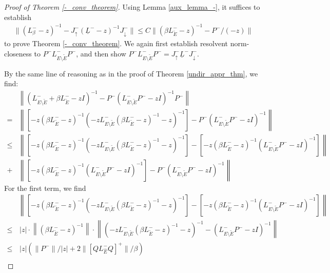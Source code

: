\documentclass[reqno,12pt,letterpaper]{amsart}
\numberwithin{equation}{section}
\newcommand{\Lin}{L^{-}}
\newcommand{\1}{\mathds{1}}
\theoremstyle{definition}
\begin{document}
\begin{proof}[Proof of Theorem \ref{-_conv_theorem}]
	Using Lemma \ref{aux_lemma_-}, it suffices to establish 
	\begin{align}
		\| (\Lin_\beta - z)^{-1} - J^-_{\uparrow} (\underline{L}^- -z)^{-1}  J^-_{\downarrow} \|
		\leq C \| (\beta \Lin_{\tilde{E}} -z)^{-1} - P^-/(-z)\| 
	\end{align}
	to prove Theorem  \ref{-_conv_theorem}.
	We again first establish resolvent norm-closeness to $P^- \Lin_{E \setminus \tilde{E}} P^-$, and then show $P^- \Lin_{E \setminus \tilde{E}} P^- = J^-_{\uparrow} \underline{L}^- J^-_{\downarrow}$.
	
	
	
	\medskip 
	
	
	By the same line of reasoning as in the proof of Theorem \ref{undir_appr_thm}, we find:	 
	\begin{align}
		&\left\| (\Lin_{E \setminus \tilde{E}} + \beta \Lin_{\tilde{E}} - z I)^{-1} - P^- ( \Lin_{E \setminus \tilde{E}} P^- - z I)^{-1} P^- \right\| \\
		=& \left\| [-z(\beta \Lin_{\tilde{E}} -z)^{-1} (-z \Lin_{E \setminus \tilde{E}} (\beta \Lin_{\tilde{E}} -z)^{-1} - z)^{-1}] -  P^- ( \Lin_{E \setminus \tilde{E}} P^- - z I)^{-1} \right\| \\
		\leq &     
		\left\| [-z(\beta \Lin_{\tilde{E}} -z)^{-1} (-z \Lin_{E \setminus \tilde{E}} (\beta \Lin_{\tilde{E}} -z)^{-1} - z)^{-1}] -  [-z(\beta \Lin_{\tilde{E}} -z)^{-1}( \Lin_{E \setminus \tilde{E}} P^- - z I)^{-1} ] \right\| \\
		+& \left\| [-z(\beta \Lin_{\tilde{E}} -z)^{-1}( \Lin_{E \setminus \tilde{E}} P^- - z I)^{-1} ] -  P^- ( \Lin_{E \setminus \tilde{E}} P^- - z I)^{-1} \right\|
	\end{align}
	For the first term, we find 
	\begin{align}
		& 	\left\| \left[ -z(\beta \Lin_{\tilde{E}} -z)^{-1} \left(-z \Lin_{E \setminus \tilde{E}} (\beta \Lin_{\tilde{E}} -z)^{-1} - z \right)^{-1} \right] -  \left[ -z(\beta \Lin_{\tilde{E}} -z)^{-1}( \Lin_{E \setminus \tilde{E}} P^- - z I)^{-1} \right] \right\| \\
		\leq & \, |z| \cdot \left\| (\beta \Lin_{\tilde{E}} -z)^{-1} \right\| \cdot \left\|
		\left(-z \Lin_{E \setminus \tilde{E}} (\beta \Lin_{\tilde{E}} -z)^{-1} - z\right)^{-1} - ( \Lin_{E \setminus \tilde{E}} P^- - z I)^{-1} 
		\right\| \\
		\leq & \,|z|\left( \|P^-\|/|z|   +   2\|[Q\Lin_{\hat{E}}Q]^+\|/\beta   \right) \\

\end{align}
\end{proof}
\end{document}
